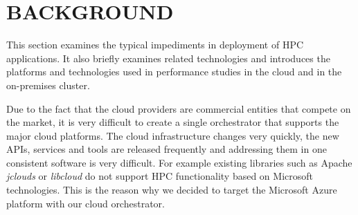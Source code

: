 \documentclass[a4paper,twoside]{article}
\begin{document}
\section{\uppercase{Background}}
\label{sec:background}

\noindent This section examines the typical impediments in deployment of HPC applications. It also briefly examines related technologies and introduces the platforms and technologies used in performance studies in the cloud and in the on-premises cluster. 

Due to the fact that the cloud providers are commercial entities that compete on the market, it is very difficult to create a single orchestrator that supports the major cloud platforms. The cloud infrastructure changes very quickly, the new APIs, services and tools are released frequently and addressing them in one consistent software is very difficult. For example existing libraries such as Apache \textit{jclouds }or \textit{libcloud} do not support HPC functionality based on Microsoft technologies. This is the reason why we decided to target the Microsoft Azure platform with our cloud orchestrator. 
\end{document}
